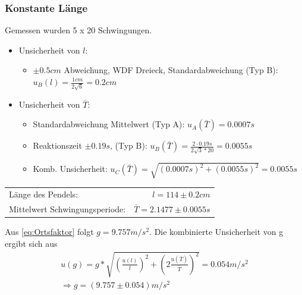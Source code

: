\documentclass[
	a4paper,
	12pt,
	pagesize,
	ngerman
]{scrartcl}
\begin{document}
	\subsubsection{Konstante Länge}
	Gemessen wurden 5 x 20 Schwingungen.
	\begin{itemize}
		\item Unsicherheit von \(l\): 
			\begin{itemize}
				\item $\pm0.5\si{cm}$ Abweichung, WDF Dreieck, Standardabweichung (Typ B): \( u_B(l) = \frac{1\si{cm}}{2\sqrt{6}} = 0.2\si{cm} \)
			\end{itemize}

		\item Unsicherheit von \(\bar{T}\): 
			\begin{itemize}
				\item Standardabweichung Mittelwert (Typ A): \( u_A(\bar{T}) = 0.0007\si{s} \)
				\item Reaktionszeit  $\pm0.19 \si{s}$, (Typ B): \( u_B(\bar{T}) = \frac{2\cdot0.19\si{s}}{2\sqrt{3}*20} = 0.0055\si{s} \)
				\item Komb. Unsicherheit: $ u_C(\bar{T}) = \sqrt{(0.0007\si{s})^2+(0.0055\si{s})^2} = 0.0055 \si{s} $
			\end{itemize}
	\end{itemize}

	\begin{tabular}{l r}
		Länge des Pendels: & \(l = 114 \pm 0.2\si{cm} \) \\
		Mittelwert Schwingungsperiode: & \(\bar{T} = 2.1477 \pm 0.0055\si{s} \) \\
	\end{tabular} 
	

	\par

	\noindent Aus \eqref{eq:Ortsfaktor} folgt $ g = 9.757  \si{m/s^2}$. Die kombinierte Unsicherheit von g ergibt sich aus
	\begin{align*}
		u(g) = g * \sqrt{\left(\frac{u(l)}{l}\right)^2 + \left(2\frac{u(\bar{T})}{\bar{T}}\right)^2} = 0.054 \si{m/s^2} \\
		\Rightarrow{} g = (9.757 \pm 0.054) \si{m/s^2}
	\end{align*}
	

	\newpage
\end{document}
